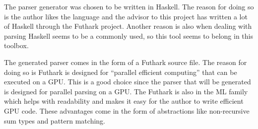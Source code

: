 The parser generator was chosen to be written in Haskell. The reason for doing so is the author likes the language and the advisor to this project has written a lot of Haskell through the Futhark project. Another reason is also when dealing with parsing Haskell seems to be a commonly used, so this tool seems to belong in this toolbox.

The generated parser comes in the form of a Futhark source file. The reason for doing so is Futhark is designed for ``parallel efficient computing'' \cite{futhark:homepage} that can be executed on a GPU. This is a good choice since the parser that will be generated is designed for parallel parsing on a GPU. The Futhark is also in the ML family which helps with readability and makes it easy for the author to write efficient GPU code. These advantages come in the form of abstractions like non-recursive sum types and pattern matching.

